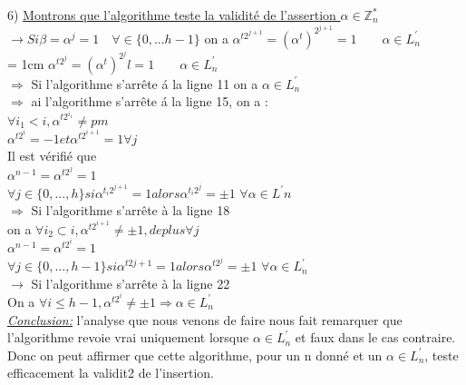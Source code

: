 \documentclass[10pt]{beamer}
\begin{document}
\begin{frame}

6) \underline{Montrons que l'algorithme teste la validit\'e de l'assertion
$\alpha \in \mathbb{Z}_n^* $}\\
$\longrightarrow Si \beta = \alpha^j =1 \quad \forall \in \{{0,...h-1}\}$
on a $ \alpha^{t2^{j+1}} =  (\alpha^t)^{2^{j+1}} = 1 \qquad \alpha \in  L^{'}_n$\\ \parindent = 1cm
$\alpha^{t2^{j}} = (\alpha^t)^{2^{j}} l = 1 \qquad \alpha \in  L^{'}_n$\\
$\Longrightarrow$ Si l'algorithme s'arr\^ete \'a la ligne 11  on a
$\alpha \in  L^{'}_n$\\
$ \Longrightarrow$ ai l'algorithme s'arr\^ete \'a la ligne 15, on a :\\
$ \forall i_1 < i , \alpha^{t2^{i_1}} \neq pm$\\
$ \alpha^{t2^i} = -1 et \alpha^{t2^{i+1}}= 1  \forall j$\\

Il est v\'erifi\'e que \\
$ \alpha^{n-1} = \alpha^{t2^{j}} = 1$\\
$ \forall j \in \{ 0,...,h\} si \alpha^{t{_i}2^{j+1}}=1 alors \alpha^{t{_i}2^{j}}=\pm1 $ \qquad  $ \forall \alpha \in L^{'}n$\\
$\Longrightarrow$  Si l'algorithme s'arr\^ete \`a la ligne 18 \\
on a $ \forall i_2 \subset i, \alpha^{t2^{i+1}}\neq \pm1, de plus \forall j$\\
$ \alpha^{n-1} = \alpha^{t2^i} = 1$\\
$ \forall j \in \{0,...,h-1\} si \alpha^{t2{j+1}} =1 alors \alpha ^{t2^{j}} = \pm 1$ \hfill $ \forall \alpha \in L^{'}_n$\\
$\longrightarrow$ Si l'algorithme s'arr\^ete \`a la ligne 22 \\
On a $\forall i \leq h-1, \alpha ^{t2^{i}} \neq \pm 1 \Longrightarrow \alpha \in  L^{'}_n $\\
\emph{\underline{Conclusion:}}
l'analyse que nous venons de faire nous fait remarquer que l'algorithme revoie vrai uniquement lorsque $\alpha \in L^{'}_n$ et faux dans le cas contraire. Donc on peut affirmer que cette algorithme, pour un n donn\'e et un $\alpha \in  L^{'}_n$, teste efficacement la validit2 de l'insertion.\\


\end{frame}
\end{document}
